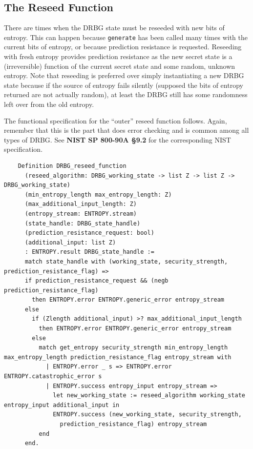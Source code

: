 \documentclass[pageno]{jpaper}
\newcommand{\stdtitle}[1]{\textbf{#1}}
\begin{document}
\subsection{The Reseed Function}
There are times when the DRBG state must be reseeded with new bits of entropy. This can happen because \lstinline{generate} has been called many times with the current bits of entropy, or because prediction resistance is requested. Reseeding with fresh entropy provides prediction resistance as the new secret state is a (irreversible) function of the current secret state and some random, unknown entropy. Note that reseeding is preferred over simply instantiating a new DRBG state because if the source of entropy fails silently (supposed the bits of entropy returned are not actually random), at least the DRBG still has some randomness left over from the old entropy.

The functional specification for the “outer” reseed function follows. Again, remember that this is the part that does error checking and is common among all types of DRBG. See \stdtitle{NIST SP 800-90A \S 9.2} for the corresponding NIST specification.

\begin{lstlisting}
    Definition DRBG_reseed_function
      (reseed_algorithm: DRBG_working_state -> list Z -> list Z -> DRBG_working_state)
      (min_entropy_length max_entropy_length: Z)
      (max_additional_input_length: Z)
      (entropy_stream: ENTROPY.stream)
      (state_handle: DRBG_state_handle)
      (prediction_resistance_request: bool)
      (additional_input: list Z)
      : ENTROPY.result DRBG_state_handle :=
      match state_handle with (working_state, security_strength, prediction_resistance_flag) =>
      if prediction_resistance_request && (negb prediction_resistance_flag)
        then ENTROPY.error ENTROPY.generic_error entropy_stream
      else
        if (Zlength additional_input) >? max_additional_input_length
          then ENTROPY.error ENTROPY.generic_error entropy_stream
        else
          match get_entropy security_strength min_entropy_length max_entropy_length prediction_resistance_flag entropy_stream with
            | ENTROPY.error _ s => ENTROPY.error ENTROPY.catastrophic_error s
            | ENTROPY.success entropy_input entropy_stream =>
              let new_working_state := reseed_algorithm working_state entropy_input additional_input in
              ENTROPY.success (new_working_state, security_strength,
                prediction_resistance_flag) entropy_stream
          end
      end.
\end{lstlisting}
\end{document}
